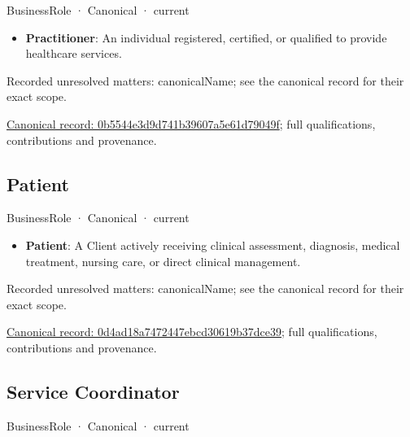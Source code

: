 \label{element:0b5544e3d9d741b39607a5e61d79049f}
{\small BusinessRole · Canonical · current}\par

\begin{itemize}


\item \textbf{Practitioner}: An individual registered, certified, or qualified to provide healthcare services.

\end{itemize}

{\small Recorded unresolved matters: canonicalName; see the canonical record for their exact scope.}\par
{\footnotesize \href{../../../../continuum/business/business-role/0b5544e3d9d741b39607a5e61d79049f.md}{Canonical record: 0b5544e3d9d741b39607a5e61d79049f}; full qualifications, contributions and provenance.}\par
\subsection{Patient}

\label{element:0d4ad18a7472447ebcd30619b37dce39}
{\small BusinessRole · Canonical · current}\par

\begin{itemize}


\item \textbf{Patient}: A Client actively receiving clinical assessment, diagnosis, medical treatment, nursing care, or direct clinical management.

\end{itemize}

{\small Recorded unresolved matters: canonicalName; see the canonical record for their exact scope.}\par
{\footnotesize \href{../../../../continuum/business/business-role/0d4ad18a7472447ebcd30619b37dce39.md}{Canonical record: 0d4ad18a7472447ebcd30619b37dce39}; full qualifications, contributions and provenance.}\par
\subsection{Service Coordinator}

\label{element:0dbbce90dc3e48b190890c832f52cb6f}
{\small BusinessRole · Canonical · current}\par

